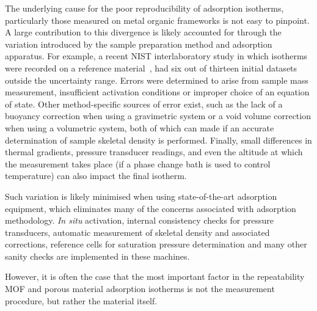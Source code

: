 The underlying cause for the poor reproducibility of adsorption
isotherms, particularly those measured on metal organic frameworks
is not easy to pinpoint. A large contribution to this divergence
is likely accounted for through the variation introduced by the
sample preparation method and adsorption apparatus.
For example, a recent NIST interlaboratory study in which  
isotherms were recorded on a reference 
material~\cite{nguyenReferenceHighpressureCO22018}, had six 
out of thirteen initial datasets outside the uncertainty range.
Errors were determined to arise from sample mass measurement,
insufficient activation conditions or improper choice of an 
equation of state. Other method-specific sources of error exist,
such as the lack of a buoyancy correction when using a 
gravimetric system or a void volume correction when using 
a volumetric system, both of which can made if an accurate
determination of sample skeletal density is performed. Finally,
small differences in thermal gradients, pressure transducer
readings, and even the altitude at which the measurement takes place
(if a phase change bath is used to control temperature)
can also impact the final isotherm.

Such variation is likely minimised when using state-of-the-art 
adsorption equipment, which eliminates many of the concerns
associated with adsorption methodology. \textit{In situ}
activation, internal consistency checks for pressure transducers,
automatic measurement of skeletal density and associated 
corrections, reference cells for saturation pressure determination
and many other sanity checks are implemented in these machines.

However, it is often the case that the most important factor
in the repeatability MOF and porous material adsorption isotherms 
is not the measurement procedure, but rather the material itself.
